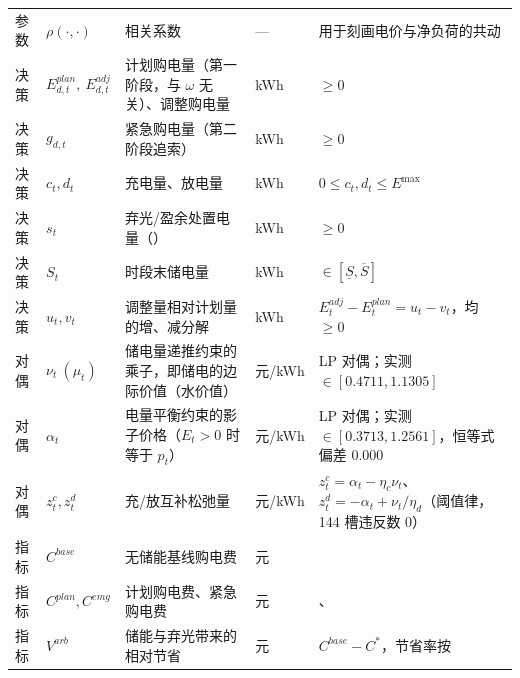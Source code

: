 \begin{table}[htbp]
\begin{tabularx}{\linewidth}{C{0.85cm} C{2.05cm} L{6.55cm} C{1.05cm} Y}
    参数 & \(\rho(\cdot,\cdot)\) & 相关系数 & --- & 用于刻画电价与净负荷的共动 \\
    决策 & \(E^{plan}_{d,t},\ E^{adj}_{d,t}\) & 计划购电量（第一阶段，与 \(\omega\) 无关）、调整购电量 & kWh & \(\ge0\) \\
    决策 & \(g_{d,t}\) & 紧急购电量（第二阶段追索） & kWh & \(\ge0\) \\
    决策 & \(c_t,d_t\) & 充电量、放电量 & kWh & \(0\le c_t,d_t\le E^{\max}\) \\
    决策 & \(s_t\) & 弃光/盈余处置电量（） & kWh & \(\ge0\) \\
    决策 & \(S_t\) & 时段末储电量 & kWh & \(\in[\underline S,\overline S]\) \\
    决策 & \(u_t,v_t\) & 调整量相对计划量的增、减分解 & kWh & \(E^{adj}_t-E^{plan}_t=u_t-v_t\)，均 \(\ge0\) \\
    对偶 & \(\nu_t\ (\mu_t)\) & 储电量递推约束的乘子，即储电的边际价值（水价值） & 元/kWh
      & LP 对偶；实测 \(\in[0.4711,1.1305]\) \\
    对偶 & \(\alpha_t\) & 电量平衡约束的影子价格（\(E_t>0\) 时等于 \(p_t\)） & 元/kWh
      & LP 对偶；实测 \(\in[0.3713,1.2561]\)，恒等式偏差 \(0.000\) \\
    对偶 & \(z^{c}_t,z^{d}_t\) & 充/放互补松弛量 & 元/kWh
      & \(z^{c}_t=\alpha_t-\eta_c\nu_t\)、\(z^{d}_t=-\alpha_t+\nu_t/\eta_d\)（阈值律，144 槽违反数 0） \\
    指标 & \(C^{base}\) & 无储能基线购电费 & 元 &  \\
    指标 & \(C^{plan},C^{emg}\) & 计划购电费、紧急购电费 & 元 & 、 \\
    指标 & \(V^{arb}\) & 储能与弃光带来的相对节省 & 元 & \(C^{base}-C^{*}\)，节省率按  \\
    \bottomrule
  \end{tabularx}
\end{table}
